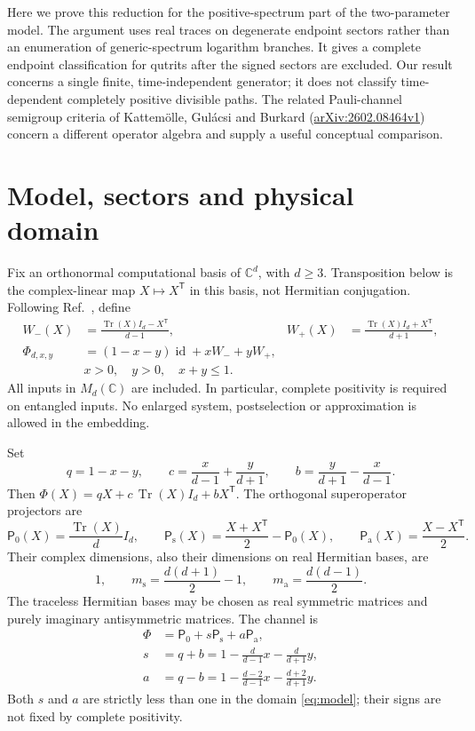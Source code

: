 \documentclass[11pt]{article}
\newcommand{\id}{\operatorname{id}}
\newcommand{\tr}{\operatorname{Tr}}
\newcommand{\Ps}{\mathsf{P}_{\mathrm{s}}}
\newcommand{\Pa}{\mathsf{P}_{\mathrm{a}}}
\newcommand{\Pz}{\mathsf{P}_{0}}
\begin{document}
Here we prove this reduction for the positive-spectrum part of the
two-parameter model. The argument uses real traces on degenerate endpoint
sectors rather than an enumeration of generic-spectrum logarithm branches.
It gives a complete endpoint classification for qutrits after the signed
sectors are excluded. Our result concerns a single finite, time-independent
generator; it does not classify time-dependent completely positive divisible
paths. The related Pauli-channel semigroup criteria of
Kattem\"olle, Gul\'acsi and Burkard
(\href{https://arxiv.org/abs/2602.08464v1}{arXiv:2602.08464v1}) concern a different
operator algebra and supply a useful conceptual comparison.

\section{Model, sectors and physical domain}

Fix an orthonormal computational basis of $\mathbb C^d$, with $d\geq3$.
Transposition below is the complex-linear map $X\mapsto X^{\mathsf T}$ in
this basis, not Hermitian conjugation. Following
Ref.~\cite{Roofeh2025}, define
\begin{align}
 W_-(X)&=\frac{\tr(X)I_d-X^{\mathsf T}}{d-1},&
 W_+(X)&=\frac{\tr(X)I_d+X^{\mathsf T}}{d+1},\label{eq:WH}\\
 \Phi_{d,x,y}&=(1-x-y)\id+xW_-+yW_+,\label{eq:model}\\
 &x>0,\quad y>0,\quad x+y\leq1. \nonumber
\end{align}
All inputs in $M_d(\mathbb C)$ are included. In particular, complete
positivity is required on entangled inputs. No enlarged system, postselection
or approximation is allowed in the embedding.

Set
\begin{equation}
 q=1-x-y,\qquad c=\frac{x}{d-1}+\frac{y}{d+1},\qquad
 b=\frac{y}{d+1}-\frac{x}{d-1}.
\end{equation}
Then $\Phi(X)=qX+c\,\tr(X)I_d+bX^{\mathsf T}$. The orthogonal
superoperator projectors are
\begin{equation}
 \Pz(X)=\frac{\tr(X)}dI_d,\qquad
 \Ps(X)=\frac{X+X^{\mathsf T}}2-\Pz(X),\qquad
 \Pa(X)=\frac{X-X^{\mathsf T}}2.                 \label{eq:projectors}
\end{equation}
Their complex dimensions, also their dimensions on real Hermitian bases, are
\begin{equation}
 1,\qquad m_{\mathrm{s}}=\frac{d(d+1)}2-1,\qquad
 m_{\mathrm{a}}=\frac{d(d-1)}2.
\end{equation}
The traceless Hermitian bases may be chosen as real symmetric matrices and
purely imaginary antisymmetric matrices. The channel is
\begin{align}
 \Phi&=\Pz+s\Ps+a\Pa,                                      \label{eq:sectors}\\
 s&=q+b=1-\frac{d}{d-1}x-\frac{d}{d+1}y, \nonumber\\
 a&=q-b=1-\frac{d-2}{d-1}x-\frac{d+2}{d+1}y. \label{eq:eigenvalues}
\end{align}
Both $s$ and $a$ are strictly less than one in the domain
\eqref{eq:model}; their signs are not fixed by complete positivity.
\end{document}
